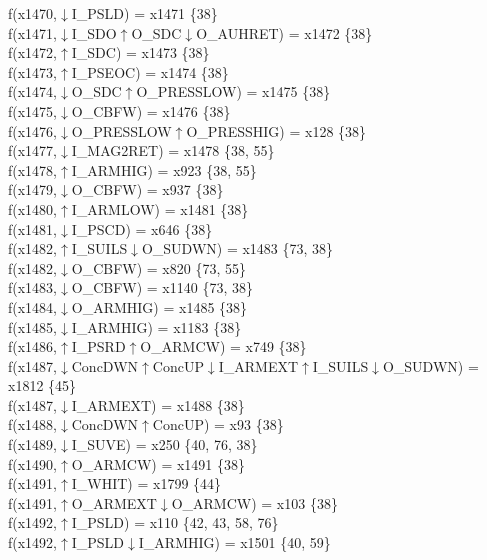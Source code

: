 f(x1470,$\downarrow$I\_PSLD) = x1471 \{38\} \\  
f(x1471,$\downarrow$I\_SDO$\uparrow$O\_SDC$\downarrow$O\_AUHRET) = x1472 \{38\} \\  
f(x1472,$\uparrow$I\_SDC) = x1473 \{38\} \\  
f(x1473,$\uparrow$I\_PSEOC) = x1474 \{38\} \\  
f(x1474,$\downarrow$O\_SDC$\uparrow$O\_PRESSLOW) = x1475 \{38\} \\  
f(x1475,$\downarrow$O\_CBFW) = x1476 \{38\} \\  
f(x1476,$\downarrow$O\_PRESSLOW$\uparrow$O\_PRESSHIG) = x128 \{38\} \\  
f(x1477,$\downarrow$I\_MAG2RET) = x1478 \{38, 55\} \\  
f(x1478,$\uparrow$I\_ARMHIG) = x923 \{38, 55\} \\  
f(x1479,$\downarrow$O\_CBFW) = x937 \{38\} \\  
f(x1480,$\uparrow$I\_ARMLOW) = x1481 \{38\} \\  
f(x1481,$\downarrow$I\_PSCD) = x646 \{38\} \\  
f(x1482,$\uparrow$I\_SUILS$\downarrow$O\_SUDWN) = x1483 \{73, 38\} \\  
f(x1482,$\downarrow$O\_CBFW) = x820 \{73, 55\} \\  
f(x1483,$\downarrow$O\_CBFW) = x1140 \{73, 38\} \\  
f(x1484,$\downarrow$O\_ARMHIG) = x1485 \{38\} \\  
f(x1485,$\downarrow$I\_ARMHIG) = x1183 \{38\} \\  
f(x1486,$\uparrow$I\_PSRD$\uparrow$O\_ARMCW) = x749 \{38\} \\  
f(x1487,$\downarrow$ConcDWN$\uparrow$ConcUP$\downarrow$I\_ARMEXT$\uparrow$I\_SUILS$\downarrow$O\_SUDWN) = x1812 \{45\} \\  
f(x1487,$\downarrow$I\_ARMEXT) = x1488 \{38\} \\  
f(x1488,$\downarrow$ConcDWN$\uparrow$ConcUP) = x93 \{38\} \\  
f(x1489,$\downarrow$I\_SUVE) = x250 \{40, 76, 38\} \\  
f(x1490,$\uparrow$O\_ARMCW) = x1491 \{38\} \\  
f(x1491,$\uparrow$I\_WHIT) = x1799 \{44\} \\  
f(x1491,$\uparrow$O\_ARMEXT$\downarrow$O\_ARMCW) = x103 \{38\} \\  
f(x1492,$\uparrow$I\_PSLD) = x110 \{42, 43, 58, 76\} \\  
f(x1492,$\uparrow$I\_PSLD$\downarrow$I\_ARMHIG) = x1501 \{40, 59\} \\  

